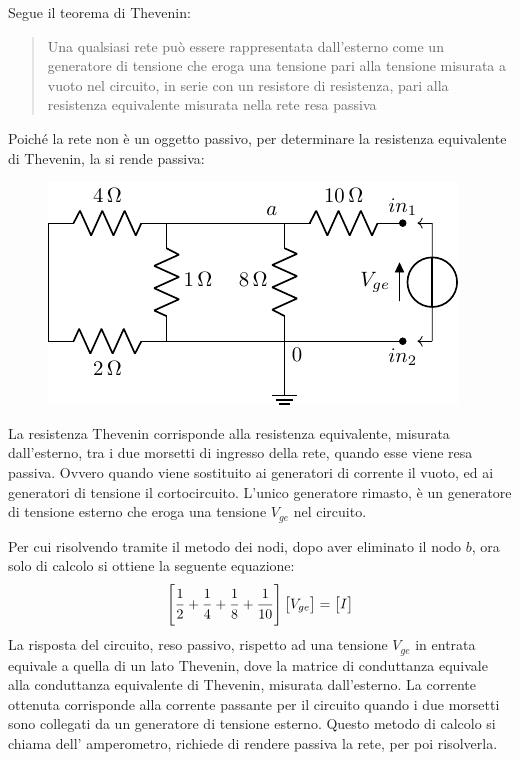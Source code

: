 \documentclass{article}
\numberwithin{equation}{subsection}
\begin{document}
Segue il teorema di Thevenin:
\begin{quotation}
    Una qualsiasi rete può essere rappresentata dall'esterno come un generatore di tensione che eroga una tensione pari alla tensione misurata a vuoto nel circuito, in serie 
    con un resistore di resistenza, pari alla resistenza equivalente misurata nella rete resa passiva
\end{quotation}
Poiché la rete non è un oggetto passivo, per determinare la resistenza equivalente di Thevenin, la si rende passiva: 
\begin{figure}[H]%
    \centering
    \includegraphics{resistenza-equivalente-circuito-8.pdf}
    \label{fig:resistenza-equivalente-circuito-8}
\end{figure}
La resistenza Thevenin corrisponde alla resistenza equivalente, misurata dall'esterno, tra i due 
morsetti di ingresso della rete, quando esse viene resa passiva. Ovvero quando viene sostituito ai generatori di corrente il vuoto, ed ai generatori di tensione il 
cortocircuito. L'unico generatore rimasto, è un generatore di tensione esterno che eroga una tensione $V_{ge}$ nel circuito. 

Per cui risolvendo tramite il metodo dei nodi, dopo aver eliminato il nodo $b$, ora solo di calcolo si ottiene la seguente equazione:
\begin{gather*}
    \begin{bmatrix}
        \displaystyle\frac{\strut 1}{\strut 2}+\frac{\strut 1}{\strut 4}+\frac{\strut 1}{\strut 8}+\frac{\strut 1}{\strut 10}
    \end{bmatrix}\begin{bmatrix}
        V_{ge}
    \end{bmatrix}=\begin{bmatrix}
        I
    \end{bmatrix}
\end{gather*}
La risposta del circuito, reso passivo, 
rispetto ad una tensione $V_{ge}$ in entrata equivale a quella di un lato Thevenin, dove la matrice di conduttanza equivale alla conduttanza equivalente di 
Thevenin, misurata dall'esterno. La corrente ottenuta 
corrisponde alla corrente passante per il circuito quando i due morsetti sono collegati da un generatore di tensione esterno. Questo metodo di calcolo si chiama dell'
amperometro, richiede di rendere passiva la rete, per poi risolverla.  
\end{document}
